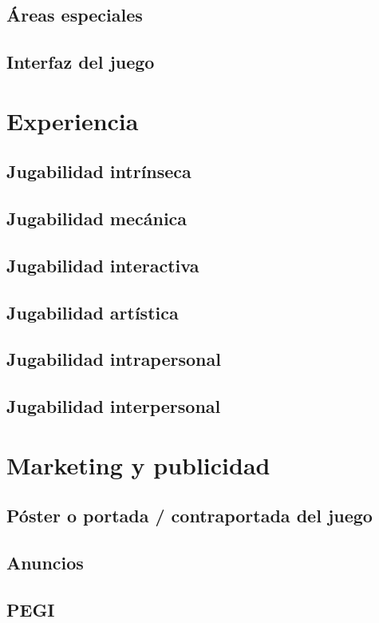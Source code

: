 \subsection{Áreas especiales}
\subsection{Interfaz del juego}


\section{Experiencia}
\subsection{Jugabilidad intrínseca}
\subsection{Jugabilidad mecánica}
\subsection{Jugabilidad interactiva}
\subsection{Jugabilidad artística}
\subsection{Jugabilidad intrapersonal}
\subsection{Jugabilidad interpersonal}

\section{Marketing y publicidad}
\subsection{Póster o portada / contraportada del juego}
\subsection{Anuncios}
\subsection{PEGI}


